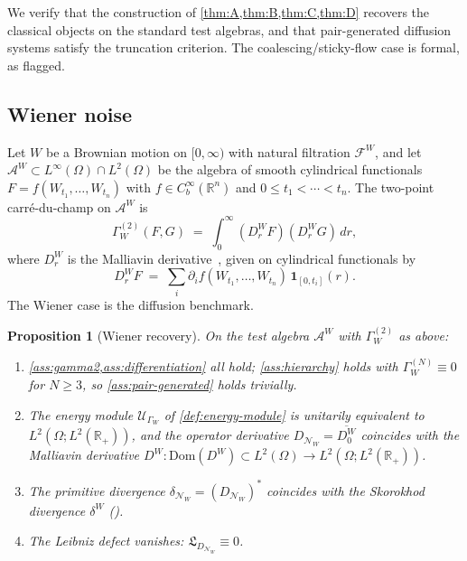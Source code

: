 \documentclass[11pt,reqno]{amsart}
\theoremstyle{plain}
\newtheorem{proposition}[theorem]{Proposition}
\theoremstyle{definition}
\theoremstyle{remark}
\newcommand{\R}{\mathbb{R}}
\newcommand{\Dom}{\mathrm{Dom}}
\newcommand{\cA}{\mathcal A}
\newcommand{\cF}{\mathcal F}
\newcommand{\cN}{\mathcal N}
\newcommand{\cU}{\mathcal U}
\newcommand{\Lleib}{\mathfrak L}
\begin{document}
We verify that the construction of \cref{thm:A,thm:B,thm:C,thm:D}
recovers the classical objects on the standard test algebras,
and that pair-generated diffusion systems satisfy the
truncation criterion. The coalescing/sticky-flow case is
formal, as flagged.

\subsection{Wiener noise}\label{sec:bench-wiener}

Let $W$ be a Brownian motion on $[0,\infty)$ with natural
filtration $\cF^{W}$, and let $\cA^{W}\subset L^{\infty}(\Omega)\cap L^{2}(\Omega)$
be the algebra of smooth cylindrical functionals
$F=f(W_{t_{1}},\ldots,W_{t_{n}})$ with $f\in C^{\infty}_{b}(\R^{n})$
and $0\le t_{1}<\cdots<t_{n}$. The two-point carr\'e-du-champ on
$\cA^{W}$ is
\[
  \Gamma^{(2)}_{W}(F,G)\;=\;\int_{0}^{\infty}(D_{r}^{W}F)(D_{r}^{W}G)\,dr,
\]
where $D_{r}^{W}$ is the Malliavin
derivative~\cite[Ch.~1]{Nualart}, given on cylindrical
functionals by
\[
  D_{r}^{W}F\;=\;\sum_{i}\partial_{i}f(W_{t_{1}},\ldots,W_{t_{n}})\,\mathbf 1_{[0,t_{i}]}(r).
\]
The Wiener case is the diffusion benchmark.

\begin{proposition}[Wiener recovery]\label{prop:wiener-recovery}
On the test algebra $\cA^{W}$ with $\Gamma^{(2)}_{W}$ as above:
\begin{enumerate}
\item[$(\mathrm i)$] \cref{ass:gamma2,ass:differentiation}
all hold; \cref{ass:hierarchy} holds with
$\Gamma^{(N)}_{W}\equiv 0$ for $N\ge 3$, so
\cref{ass:pair-generated} holds trivially.
\item[$(\mathrm{ii})$] The energy module $\cU_{\Gamma_{W}}$ of
\cref{def:energy-module} is unitarily equivalent to
$L^{2}(\Omega;L^{2}(\R_{+}))$, and the operator derivative
$D_{\cN_{W}}=\overline{D_{0}^{W}}$ coincides with the Malliavin
derivative $D^{W}\colon\Dom(D^{W})\subset L^{2}(\Omega)\to L^{2}(\Omega;L^{2}(\R_{+}))$.
\item[$(\mathrm{iii})$] The primitive divergence
$\delta_{\cN_{W}}=(D_{\cN_{W}})^{*}$ coincides with the Skorokhod
divergence $\delta^{W}$ (\cite[Ch.~1]{Nualart}).
\item[$(\mathrm{iv})$] The Leibniz defect vanishes:
$\Lleib_{D_{\cN_{W}}}\equiv 0$.
\end{enumerate}
\end{proposition}
\end{document}
